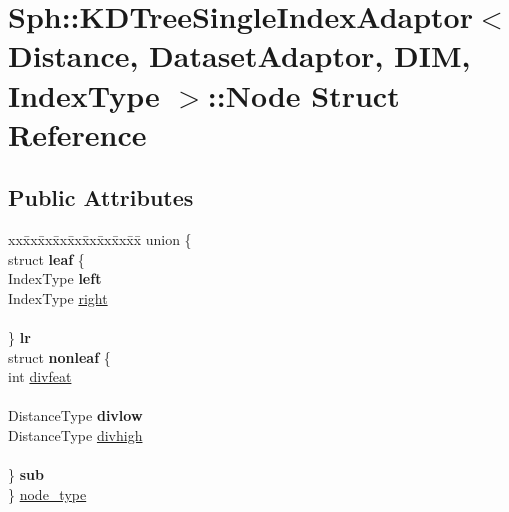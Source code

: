 \hypertarget{structSph_1_1KDTreeSingleIndexAdaptor_1_1Node}{}\section{Sph\+:\+:K\+D\+Tree\+Single\+Index\+Adaptor$<$ Distance, Dataset\+Adaptor, D\+IM, Index\+Type $>$\+:\+:Node Struct Reference}
\label{structSph_1_1KDTreeSingleIndexAdaptor_1_1Node}
\subsection*{Public Attributes}
\begin{DoxyCompactItemize}
\item 
\begin{tabbing}
xx\=xx\=xx\=xx\=xx\=xx\=xx\=xx\=xx\=\kill
union \{\\
\>struct {\bfseries leaf} \{\\
\>\>IndexType {\bfseries left}\\
\>\>IndexType \hyperlink{structSph_1_1KDTreeSingleIndexAdaptor_1_1Node_af113c9c56164fcb7f8162442c2dce67a}{right}\\
\>\>\\
\>\} {\bfseries lr}\\
\>struct {\bfseries nonleaf} \{\\
\>\>int \hyperlink{structSph_1_1KDTreeSingleIndexAdaptor_1_1Node_a613c1685d60dec4d84508a6a84455172}{divfeat}\\
\>\>\\
\>\>DistanceType {\bfseries divlow}\\
\>\>DistanceType \hyperlink{structSph_1_1KDTreeSingleIndexAdaptor_1_1Node_afb61f548f4bcde7e99228f7820566e2b}{divhigh}\\
\>\>\\
\>\} {\bfseries sub}\\
\} \hyperlink{structSph_1_1KDTreeSingleIndexAdaptor_1_1Node_a5b93ce4ef4b68d3222e41fcf4802d337}{node\_type}\\


\end{tabbing}
\end{DoxyCompactItemize}
